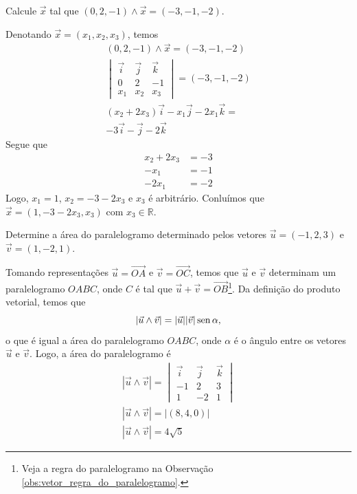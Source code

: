 \begin{exeresol}
  Calcule $\vec{x}$ tal que $(0,2,-1)\land\vec{x}=(-3,-1,-2)$.
\end{exeresol}
\begin{resol}
  Denotando $\vec{x}=(x_1,x_2,x_3)$, temos
  \begin{gather}
    (0,2,-1)\land\vec{x}=(-3,-1,-2)\\
    \begin{vmatrix}
      \vec{i} & \vec{j} & \vec{k} \\
      0 & 2 & -1 \\
      x_1 & x_2 & x_3
    \end{vmatrix} = (-3,-1,-2)\\
    (x_2+2x_3)\vec{i}-x_1\vec{j}-2x_1\vec{k} = \\
    -3\vec{i}-\vec{j}-2\vec{k}
  \end{gather}
  Segue que
  \begin{align*}
    x_2+2x_3 &= -3\\
    -x_1 &= -1\\
    -2x_1 &= -2
  \end{align*}
  Logo, $x_1 = 1$, $x_2=-3-2x_3$ e $x_3$ é arbitrário. Conluímos que $\vec{x} = (1,-3-2x_3,x_3)$ com $x_3\in\mathbb{R}$.
\end{resol}

\begin{exeresol}
  Determine a área do paralelogramo determinado pelos vetores $\vec{u} = (-1, 2, 3)$ e $\vec{v} = (1,-2,1)$.
\end{exeresol}
\begin{resol}
  Tomando representações $\vec{u}=\overrightarrow{OA}$ e $\vec{v}=\overrightarrow{OC}$, temos que $\vec{u}$ e $\vec{v}$ determinam um paralelogramo $OABC$, onde $C$ é tal que $\vec{u}+\vec{v}=\overrightarrow{OB}$\footnote{Veja a regra do paralelogramo na Observação \ref{obs:vetor_regra_do_paralelogramo}.}. Da definição do produto vetorial, temos que
  \begin{equation}
    |\vec{u}\land\vec{v}| = |\vec{u}||\vec{v}|\operatorname{sen}\alpha,
  \end{equation}
  o que é igual a área do paralelogramo $OABC$, onde $\alpha$ é o ângulo entre os vetores $\vec{u}$ e $\vec{v}$. Logo, a área do paralelogramo é
  \begin{gather}
    |\vec{u}\land\vec{v}| =
    \begin{vmatrix}
      \vec{i} & \vec{j} & \vec{k} \\
      -1 & 2 & 3 \\
      1 & -2 & 1
    \end{vmatrix}\\
    |\vec{u}\land\vec{v}| = |(8,4,0)|\\
    |\vec{u}\land\vec{v}| = 4\sqrt{5}
  \end{gather}
\end{resol}

